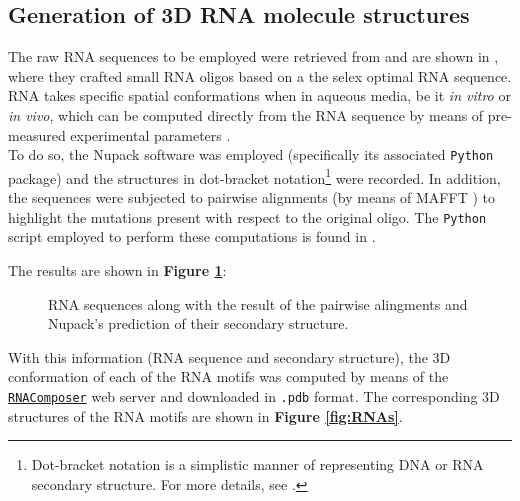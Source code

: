 \subsection{Generation of 3D RNA molecule structures}

The raw RNA sequences to be employed were retrieved from \cite{dolcemascolo_2022} and are shown in \textbf{}, where they crafted small RNA oligos based on a the selex optimal RNA sequence. RNA takes specific spatial conformations when in aqueous media, be it \textit{in vitro} or \textit{in vivo}, which can be computed directly from the RNA sequence by means of pre-measured experimental parameters \cite{santalucia_1998}.\\

To do so, the Nupack software was employed \cite{dirks_2004} (specifically its associated \texttt{Python} package) and the structures in dot-bracket notation\footnote{Dot-bracket notation is a simplistic manner of representing DNA or RNA secondary structure. For more details, see \cite{rna_structure_notations}.} were recorded. In addition, the sequences were subjected to pairwise alignments (by means of MAFFT \cite{katoh_2002}) to highlight the mutations present with respect to the original oligo. The \texttt{Python} script employed to perform these computations is found in \textbf{}.

\vfill

\pagebreak

The results are shown in \textbf{Figure \ref{fig:dataset}}:

\begin{figure}[htbp!]
    
    \caption{RNA sequences along with the result of the pairwise alingments and Nupack's prediction of their secondary structure.}
    \label{fig:dataset}
\end{figure}

With this information (RNA sequence and secondary structure), the 3D conformation of each of the RNA motifs was computed by means of the \href{https://rnacomposer.cs.put.poznan.pl/}{\texttt{RNAComposer}} web server \cite{biesiada_2016} and downloaded in \texttt{.pdb} format. The corresponding 3D structures of the RNA motifs are shown in \textbf{Figure \ref{fig:RNAs}}.

